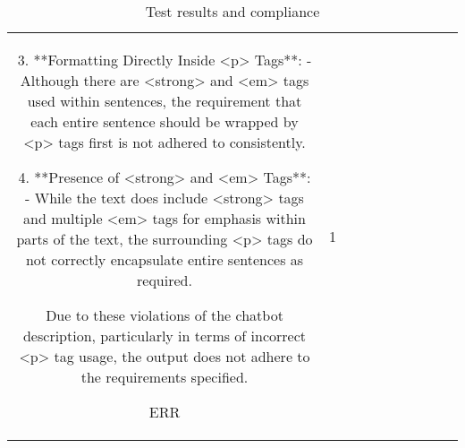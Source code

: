 \begin{table}[h!]
\begin{tabular}{|c|c|c|c|c|c|c|c|c|c|}
3. **Formatting Directly Inside <p> Tags**: 
   - Although there are <strong> and <em> tags used within sentences, the requirement that each entire sentence should be wrapped by <p> tags first is not adhered to consistently. 

4. **Presence of <strong> and <em> Tags**: 
   - While the text does include <strong> tags and multiple <em> tags for emphasis within parts of the text, the surrounding <p> tags do not correctly encapsulate entire sentences as required.

Due to these violations of the chatbot description, particularly in terms of incorrect <p> tag usage, the output does not adhere to the requirements specified.

ERR & 1
  \end{tabular}
  \caption{Test results and compliance}
  
  \end{table}
  